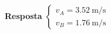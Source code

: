 \textbf{Resposta}
$
\begin{cases}
	v_{A}=\SI{3.52}{\meter/\second}\\
	v_{B}=\SI{1.76}{\meter/\second}
\end{cases}
$